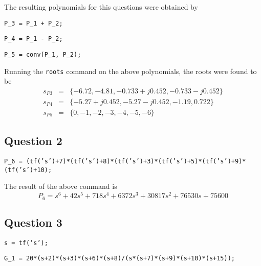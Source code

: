 \documentclass[12pt, a4paper]{article}
\begin{document}
			\noindent The resulting polynomials for this questions were obtained by \par
			\texttt{P\_3 = P\_1 + P\_2;} \par
			\texttt{P\_4 = P\_1 - P\_2;} \par
			\texttt{P\_5 = conv(P\_1, P\_2);} \par

			\noindent Running the \texttt{roots} command on the above polynomials, the roots were found to be
			\begin{equation*}
				\begin{array}{rcl}
					s_{P3} & = & \{-6.72,-4.81,-0.733 + j0.452, -0.733 - j0.452\} \\
					s_{P4} & = & \{-5.27 + j0.452,-5.27 - j0.452, -1.19, 0.722\} \\
					s_{P5} & = & \{0,-1,-2,-3,-4,-5,-6\}
				\end{array}
			\end{equation*}

		\subsection*{Question 2} %
		\label{sub:question_2}
			\texttt{P\_6 = (tf('s')+7)*(tf('s')+8)*(tf('s')+3)*(tf('s')+5)*(tf('s')+9)*(tf('s')+10);} \par\noindent
			The result of the above command is
			\[
				P_6 = s^6 + 42 s^5 + 718 s^4 + 6372 s^3 + 30817 s^2 + 76530 s + 75600
			\]



		\subsection*{Question 3} %
		\label{sub:question_3}
			\texttt{s = tf('s');} \par\noindent
			\texttt{G\_1 = 20*(s+2)*(s+3)*(s+6)*(s+8)/(s*(s+7)*(s+9)*(s+10)*(s+15));}
\end{document}
